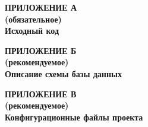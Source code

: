 \newpage
\begin{center}
  \textbf{
  \MakeUppercase{Приложение А}\\
  (обязательное)\\
  Исходный код}
  \end{center}
  
  
  
  
  
  
  \newpage
  
  \begin{center}
  \textbf{
  \MakeUppercase{Приложение Б}\\
  (рекомендуемое)\\
  Описание схемы базы данных}
  \end{center}
  
  
  
  \newpage
  
  \begin{center}
  \textbf{
  \MakeUppercase{Приложение В}\\
  (рекомендуемое)\\
  Конфигурационные файлы проекта}
  \end{center}
  
  
  \newpage
  